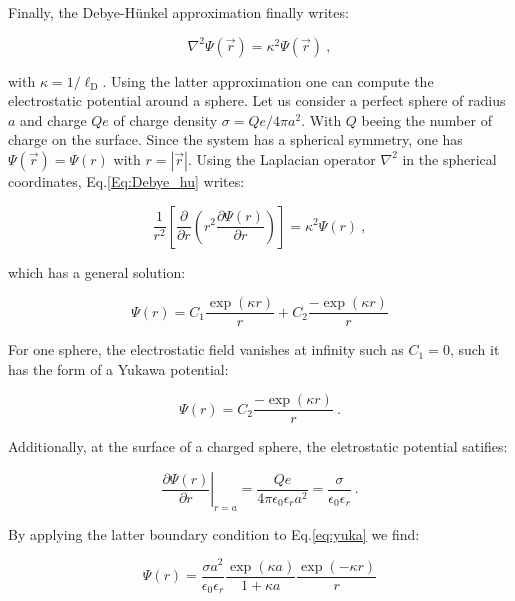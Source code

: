 Finally, the Debye-Hünkel approximation finally writes:

\begin{equation}
	\nabla^2 \Psi (\vec{r}) = \kappa^2  \Psi (\vec{r}) ~,
	\label{Eq:Debye_hu}
\end{equation}

with $\kappa = 1/\ell _\mathrm{D}$. Using the latter approximation one can compute the electrostatic potential around a sphere. Let us consider a perfect sphere of radius $a$ and charge $Qe$ of charge density $\sigma = Qe/4\pi a^2$. With $Q$ beeing the number of charge on the surface. Since the system has a spherical symmetry, one has $\Psi (\vec{r}) = \Psi(r)$ with $r = |\vec{r}|$. Using the Laplacian operator $\nabla ^2$ in the spherical coordinates, Eq.\ref{Eq:Debye_hu} writes:

\begin{equation}
	\frac{1}{r^2}\left[\frac{\partial}{\partial r} \left(r^2 \frac{\partial \Psi(r)}{\partial r}\right)\right] = \kappa^2  \Psi (r) ~,
\end{equation}

which has a general solution:

\begin{equation}
	\Psi(r) = C_1 \frac{\exp(\kappa r)}{r} + C_2 \frac{-\exp(\kappa r)}{r}
\end{equation}

For one sphere, the electrostatic field vanishes at infinity such as $C_1 = 0$, such it has the form of a Yukawa potential:

\begin{equation}
	\Psi (r) = C_2 \frac{-\exp(\kappa r)}{r} ~.
	\label{eq:yuka}
\end{equation}

Additionally, at the surface of a charged sphere, the eletrostatic potential satifies:

\begin{equation}
\left. \frac{\partial{\Psi (r)}}{\partial r} \right|_{r=a} = \frac{Qe}{4 \pi \epsilon_0 \epsilon_r a^2}  = \frac{\sigma}{\epsilon_0 \epsilon_r} ~.
\end{equation}

By applying the latter boundary condition to Eq.\ref{eq:yuka} we find:

\begin{equation}
	\Psi (r) = \frac{\sigma a^2}{\epsilon_0 \epsilon_r} \frac{\exp (\kappa a)}{1 + \kappa a} \frac{\exp (-\kappa r)}{r}
\end{equation}


